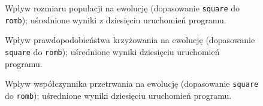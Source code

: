 \documentclass[a4paper,12pt,leqno]{article}
\begin{document}
\begin{figure}\centering
\footnotesize\vspace{-2em}
\normalsize\caption{Wpływ rozmiaru populacji na ewolucję (dopasowanie \texttt{square} do \texttt{romb}); uśrednione wyniki z dziesięciu uruchomień programu.}
\end{figure}
\begin{figure}\centering
\footnotesize\vspace{-2em}
\normalsize\caption{Wpływ prawdopodobieństwa krzyżowania na ewolucję (dopasowanie \texttt{square} do \texttt{romb}); uśrednione wyniki dziesięciu uruchomień programu.}
\end{figure}
\begin{figure}\centering
\footnotesize\vspace{-2em}
\normalsize\caption{Wpływ współczynnika przetrwania na ewolucję (dopasowanie \texttt{square} do \texttt{romb}); uśrednione wyniki dziesięciu uruchomień programu.}
\end{figure}
\end{document}
